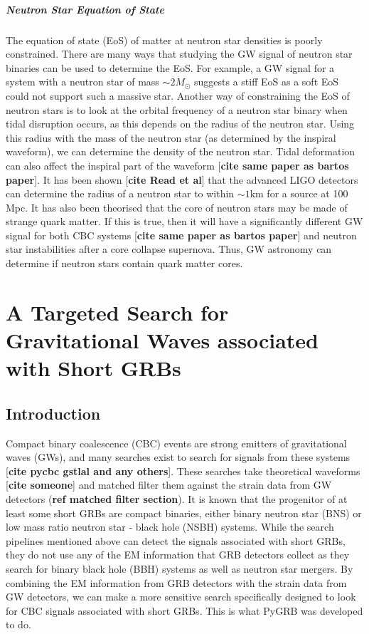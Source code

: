 \documentclass[11pt]{cuthesis}
\begin{document}
\paragraph{Neutron Star Equation of State}
The equation of state (EoS) of matter at neutron star densities is poorly constrained. There are many ways that studying the GW signal of neutron star binaries can be used to determine the EoS. For example, a GW signal for a system with a neutron star of mass $\sim 2M_\odot$ suggests a stiff EoS as a soft EoS could not support such a massive star. Another way of constraining the EoS of neutron stars is to look at the orbital frequency of a neutron star binary when tidal disruption occurs, as this depends on the radius of the neutron star. Using this radius with the mass of the neutron star (as determined by the inspiral waveform), we can determine the density of the neutron star. Tidal deformation can also affect the inspiral part of the waveform [\textbf{cite same paper as bartos paper}]. It has been shown [\textbf{cite Read et al}] that the advanced LIGO detectors can determine the radius of a neutron star to within $\sim 1$km for a source at 100 Mpc. It has also been theorised that the core of neutron stars may be made of strange quark matter. If this is true, then it will have a significantly different GW signal for both CBC systems [\textbf{cite same paper as bartos paper}] and neutron star instabilities after a core collapse supernova. Thus, GW astronomy can determine if neutron stars contain quark matter cores. 


\chapter{A Targeted Search for Gravitational Waves associated with Short GRBs} \label{chap: CBC}
\section{Introduction}\label{CBCintro}
Compact binary coalescence (CBC) events are strong emitters of gravitational waves (GWs), and many searches exist to search for signals from these systems [\textbf{cite pycbc gstlal and any others}]. These searches take theoretical waveforms [\textbf{cite someone}] and matched filter them against the strain data from GW detectors (\textbf{ref matched filter section}). It is known that the progenitor of at least some short GRBs are compact binaries, either binary neutron star (BNS) or low mass ratio neutron star - black hole (NSBH) systems. While the search pipelines mentioned above can detect the signals associated with short GRBs, they do not use any of the EM information that GRB detectors collect as they search for binary black hole (BBH) systems as well as neutron star mergers. By combining the EM information from GRB detectors with the strain data from GW detectors, we can make a more sensitive search specifically designed to look for CBC signals associated with short GRBs. This is what PyGRB was developed to do.
\end{document}
